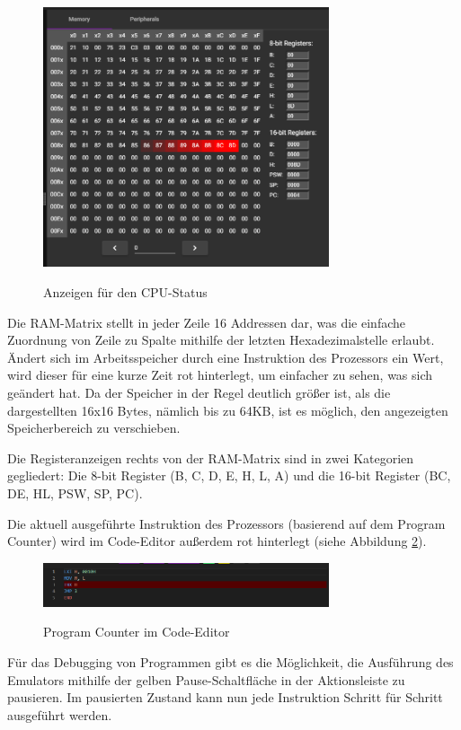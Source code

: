 \begin{figure}
    \caption{Anzeigen für den CPU-Status}
    \centering
    \includegraphics[width=0.75\textwidth]{Bilder/CPUState.png}
    \label{fig:cpustate}
\end{figure}

Die RAM-Matrix stellt in jeder Zeile 16 Addressen dar, was die einfache Zuordnung von Zeile zu Spalte mithilfe der letzten Hexadezimalstelle erlaubt. Ändert sich im Arbeitsspeicher durch eine Instruktion des Prozessors ein Wert, wird dieser für eine kurze Zeit rot hinterlegt, um einfacher zu sehen, was sich geändert hat. Da der Speicher in der Regel deutlich größer ist, als die dargestellten 16x16 Bytes, nämlich bis zu 64KB, ist es möglich, den angezeigten Speicherbereich zu verschieben.

Die Registeranzeigen rechts von der RAM-Matrix sind in zwei Kategorien gegliedert: Die 8-bit Register (B, C, D, E, H, L, A) und die 16-bit Register (BC, DE, HL, PSW, SP, PC).

Die aktuell ausgeführte Instruktion des Prozessors (basierend auf dem Program Counter) wird im Code-Editor außerdem rot hinterlegt (siehe Abbildung \ref{fig:linehighlight}).

\begin{figure}
    \caption{Program Counter im Code-Editor}
    \centering
    \includegraphics[width=0.75\textwidth]{Bilder/LineHighlight.png}
    \label{fig:linehighlight}
\end{figure}

Für das Debugging von Programmen gibt es die Möglichkeit, die Ausführung des Emulators mithilfe der gelben Pause-Schaltfläche in der Aktionsleiste zu pausieren. Im pausierten Zustand kann nun jede Instruktion Schritt für Schritt ausgeführt werden.